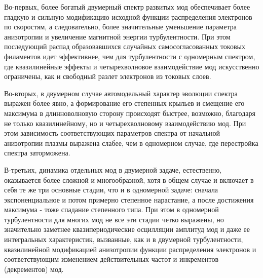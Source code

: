 Во-первых, более богатый двумерный спектр развитых мод обеспечивает более гладкую и сильную модификацию исходной функции распределения электронов по скоростям, а следовательно, более значительные уменьшение параметра анизотропии и увеличение магнитной энергии турбулентности. При этом последующий распад образовавшихся случайных самосогласованных токовых филаментов идет эффективнее, чем для турбулентности с одномерным спектром, где квазилинейные эффекты и четырехволновое взаимодействие мод искусственно ограничены, как и свободный разлет электронов из токовых слоев.

Во-вторых, в двумерном случае автомодельный характер эволюции спектра выражен более явно, а формирование его степенных крыльев и смещение его максимума в длинноволновую сторону происходят быстрее, возможно, благодаря не только квазилинейному, но и четырехволновому взаимодействию мод. При этом зависимость соответствующих параметров спектра от начальной анизотропии плазмы выражена слабее, чем в одномерном случае, где перестройка спектра заторможена.

В-третьих, динамика отдельных мод в двумерной задаче, естественно, оказывается более сложной и многообразной, хотя в общем случае и включает в себя те же три основные стадии, что и в одномерной задаче: сначала экспоненциальное и потом примерно степенное нарастание, а после достижения максимума -  тоже спадание степенного типа. При этом в одномерной турбулентности для многих мод не все эти стадии четко выражены, но значительно заметнее квазипериодические осцилляции амплитуд мод и даже ее интегральных характеристик, вызванные, как и в двумерной турбулентности, квазилинейной модификацией анизотропии функции распределения электронов и соответствующим изменением действительных частот и инкрементов (декрементов) мод.
  